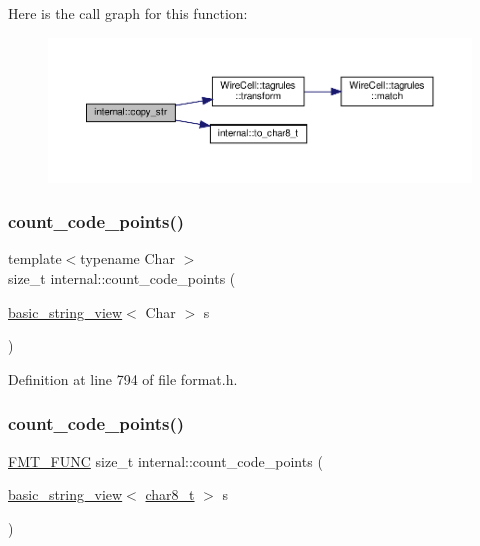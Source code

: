 Here is the call graph for this function\+:
\nopagebreak
\begin{figure}[H]
\begin{center}
\leavevmode
\includegraphics[width=350pt]{namespaceinternal_a6ad6580819e6e957d9c2cab372b6e620_cgraph}
\end{center}
\end{figure}
\mbox{\label{namespaceinternal_a6bf28ac9489563e7fcb2a24eabc51502}} 
\subsubsection{\texorpdfstring{count\+\_\+code\+\_\+points()}{count\_code\_points()}\hspace{0.1cm}{\footnotesize\ttfamily [1/2]}}
{\footnotesize\ttfamily template$<$typename Char $>$ \\
size\+\_\+t internal\+::count\+\_\+code\+\_\+points (\begin{DoxyParamCaption}\item[{\hyperlink{classbasic__string__view}{basic\+\_\+string\+\_\+view}$<$ Char $>$}]{s }\end{DoxyParamCaption})\hspace{0.3cm}{\ttfamily [inline]}}



Definition at line 794 of file format.\+h.

\mbox{\label{namespaceinternal_a4482dd4f8307cd67b97c0c5ac41e5c6a}} 
\subsubsection{\texorpdfstring{count\+\_\+code\+\_\+points()}{count\_code\_points()}\hspace{0.1cm}{\footnotesize\ttfamily [2/2]}}
{\footnotesize\ttfamily \hyperlink{format_8h_a02c8898388e0ae59aab58be14fcd4e05}{F\+M\+T\+\_\+\+F\+U\+NC} size\+\_\+t internal\+::count\+\_\+code\+\_\+points (\begin{DoxyParamCaption}\item[{\hyperlink{classbasic__string__view}{basic\+\_\+string\+\_\+view}$<$ \hyperlink{format_8h_ad71c872603735b57c8417f76de44077b}{char8\+\_\+t} $>$}]{s }\end{DoxyParamCaption})}



